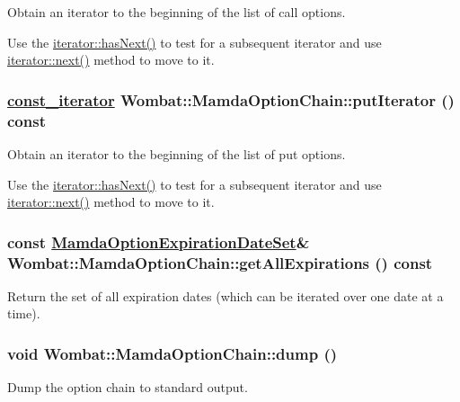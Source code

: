 Obtain an iterator to the beginning of the list of call options. 

Use the \hyperlink{classWombat_1_1MamdaOptionChain_1_1iterator_2b7d07e58b4f3b0134d57483388f106c}{iterator::has\-Next()} to test for a subsequent iterator and use \hyperlink{classWombat_1_1MamdaOptionChain_1_1iterator_ca4efaeb0cd56b2ec22bcc8288e78a81}{iterator::next()} method to move to it. \hypertarget{classWombat_1_1MamdaOptionChain_051522c5af2231be1771c9482a017e84}{
\subsubsection[putIterator]{\setlength{\rightskip}{0pt plus 5cm}\hyperlink{classWombat_1_1MamdaOptionChain_1_1const__iterator}{const\_\-iterator} Wombat::Mamda\-Option\-Chain::put\-Iterator () const}}
\label{classWombat_1_1MamdaOptionChain_051522c5af2231be1771c9482a017e84}


Obtain an iterator to the beginning of the list of put options. 

Use the \hyperlink{classWombat_1_1MamdaOptionChain_1_1iterator_2b7d07e58b4f3b0134d57483388f106c}{iterator::has\-Next()} to test for a subsequent iterator and use \hyperlink{classWombat_1_1MamdaOptionChain_1_1iterator_ca4efaeb0cd56b2ec22bcc8288e78a81}{iterator::next()} method to move to it. \hypertarget{classWombat_1_1MamdaOptionChain_f55c38897392baaea74b1f2905d3e026}{
\subsubsection[getAllExpirations]{\setlength{\rightskip}{0pt plus 5cm}const \hyperlink{classWombat_1_1MamdaOptionExpirationDateSet}{Mamda\-Option\-Expiration\-Date\-Set}\& Wombat::Mamda\-Option\-Chain::get\-All\-Expirations () const}}
\label{classWombat_1_1MamdaOptionChain_f55c38897392baaea74b1f2905d3e026}


Return the set of all expiration dates (which can be iterated over one date at a time). 

\hypertarget{classWombat_1_1MamdaOptionChain_9149b46f6ba398eb7f3ef458cc43a09c}{
\subsubsection[dump]{\setlength{\rightskip}{0pt plus 5cm}void Wombat::Mamda\-Option\-Chain::dump ()}}
\label{classWombat_1_1MamdaOptionChain_9149b46f6ba398eb7f3ef458cc43a09c}


Dump the option chain to standard output. 

